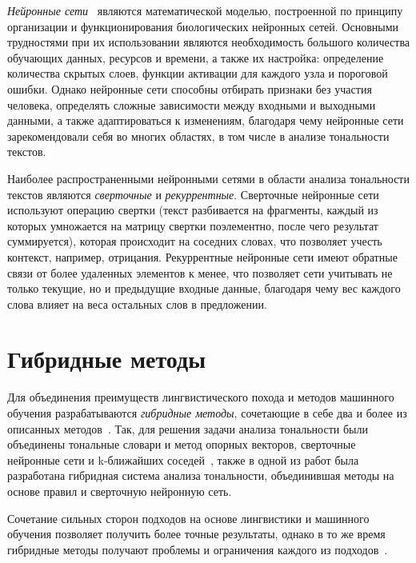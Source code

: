 \textit{Нейронные сети}~\cite{article05} являются математической моделью,
построенной по принципу организации и функционирования биологических нейронных
сетей. Основными трудностями при их использовании являются необходимость
большого количества обучающих данных, ресурсов и времени, а также  их настройка:
определение количества скрытых слоев, функции активации для каждого узла и
пороговой ошибки. Однако нейронные сети способны отбирать признаки без участия
человека, определять сложные зависимости между входными и выходными данными, а
также адаптироваться к изменениям, благодаря чему нейронные сети зарекомендовали
себя во многих областях, в том числе в анализе тональности текстов.

Наиболее распространенными нейронными сетями в области анализа тональности
текстов являются \textit{сверточные} и \textit{рекуррентные}. Сверточные
нейронные сети используют операцию свертки (текст разбивается на фрагменты,
каждый из которых умножается на матрицу свертки поэлементно, после чего результат
суммируется), которая происходит на соседних словах, что позволяет учесть
контекст, например, отрицания. Рекуррентные нейронные сети имеют  обратные связи
от более удаленных элементов к менее, что позволяет сети учитывать не только
текущие, но и предыдущие входные данные, благодаря чему вес каждого слова влияет
на веса остальных слов в предложении.

\section{Гибридные методы}

Для объединения преимуществ лингвистического похода и методов машинного обучения
разрабатываются \textit{гибридные методы}, сочетающие в себе два и более из описанных
методов~\cite{article5}. Так, для решения задачи анализа тональности были
объединены тональные словари и метод опорных векторов, сверточные нейронные сети
и k-ближайших соседей~\cite{article14}, также в одной из работ была разработана
гибридная система анализа тональности, объединившая методы на основе
правил и сверточную нейронную сеть.

Сочетание сильных сторон подходов на основе лингвистики и машинного обучения
позволяет получить более точные результаты, однако в то же время гибридные
методы получают проблемы и ограничения каждого из
подходов~\cite{article15}.

